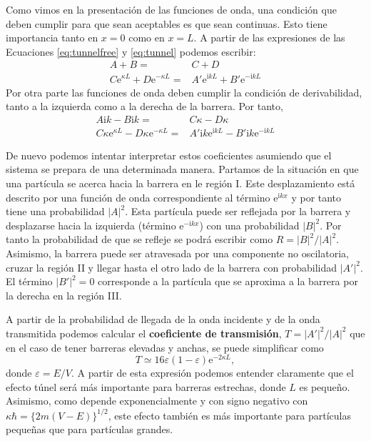 \documentclass{tufte-handout}
\begin{document}
Como vimos en la presentación de las funciones de onda, 
una condición que deben cumplir para que sean aceptables 
es que sean continuas. Esto tiene importancia tanto en $x=0$
como en $x=L$. A partir de las expresiones de las Ecuaciones
\ref{eq:tunnelfree} y \ref{eq:tunnel} podemos escribir:
\begin{subequations}
    \begin{align}
         A + B =&C + D \\
         C\mathrm{e}^{\kappa L} + D\mathrm{e}^{-\kappa L}=&
         A'\mathrm{e}^{\mathrm{i}kL} + B'\mathrm{e}^{-\mathrm{i}kL}
    \end{align}
\end{subequations}
Por otra parte las funciones de onda deben cumplir la
condición de derivabilidad, tanto a la izquierda como a
la derecha de la barrera. Por tanto,
\begin{subequations}
    \begin{align}
        A\mathrm{i}k-B\mathrm{i}k =& C\kappa - D\kappa \\
        C\kappa\mathrm{e}^{\kappa L} - D\kappa\mathrm{e}^{-\kappa L} =& A'\mathrm{i}k\mathrm{e}^{\mathrm{i}kL}-B'\mathrm{i}k\mathrm{e}^{-\mathrm{i}kL}
    \end{align}
\end{subequations}

De nuevo podemos intentar interpretar estos coeficientes 
asumiendo que el sistema se prepara de una determinada 
manera. Partamos de la situación en que una partícula se
acerca hacia la barrera en le región I. Este desplazamiento
está descrito por una función
de onda correspondiente al término $\mathrm{e}^{\mathrm{i}kx}$ 
y por tanto tiene una probabilidad $|A|^2$. Esta partícula
puede ser reflejada por la barrera y desplazarse hacia la
izquierda (término $\mathrm{e}^{-\mathrm{i}kx}$) con una 
probabilidad $|B|^2$. Por tanto la probabilidad de que se
refleje se podrá escribir como $R=|B|^2/|A|^2$. Asimismo,
la barrera puede ser atravesada por una componente no 
oscilatoria, cruzar la región II y llegar hasta el otro lado 
de la barrera con probabilidad $|A'|^2$. El término $|B'|^2=0$
corresponde a la partícula que se aproxima a la barrera por la 
derecha en la región III.

A partir de la probabilidad de llegada de la onda incidente
y de la onda transmitida podemos calcular
el \textbf{coeficiente de transmisión}, 
    $T=|A'|^2/|A|^2$
que en el caso de tener 
barreras elevadas y anchas, se puede simplificar como
\begin{equation}
    T\simeq 16\varepsilon(1-\varepsilon)\mathrm{e}^{-2\kappa L},
\end{equation}
donde $\varepsilon=E/V$. A partir de esta expresión podemos
entender claramente que el efecto túnel será más importante 
para barreras estrechas, donde $L$ es pequeño. Asimismo,
como depende exponencialmente y con signo negativo con 
$\kappa\hbar=\{2m(V-E)\}^{1/2}$, este efecto también es
más importante para partículas pequeñas que para partículas
grandes.
\end{document}
